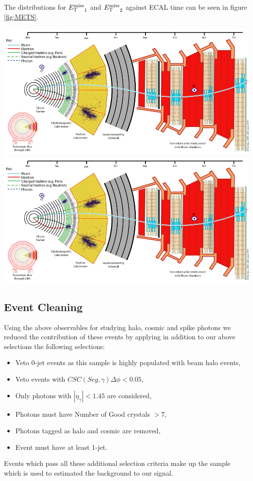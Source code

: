 The distributions for ${E_{\mathrm{T}}^{\text{miss}}}_{1}$ and ${E_{\mathrm{T}}^{\text{miss}}}_{2}$  against ECAL time can be seen in figure \ref{fig:METS}.

\begin{center}
\centering
\includegraphics[scale=0.2]{THESISPLOTS/CMS_Slice.png}
\includegraphics[scale=0.2]{THESISPLOTS/CMS_Slice.png}
\label{fig:METS}
\end{center}

\subsection{Event Cleaning}
Using the above observables for studying halo, cosmic and spike photons we reduced the contribution of these events by applying in addition to our above selections the following selections:
\begin{itemize}
\item Veto 0-jet events as this sample is highly populated with beam halo events, 
\item Veto events with $CSC(Seg,\gamma)\Delta\phi < 0.05$,
\item Only photons with $|\eta_{\gamma}| < 1.45$ are considered,
\item Photons must have Number of Good crystals $ > 7$,
\item Photons tagged as halo and cosmic are removed,
\item Event must have at least 1-jet.
\end{itemize}
Events which pass all these additional selection criteria make up the sample which is used to estimated the background to our signal.


